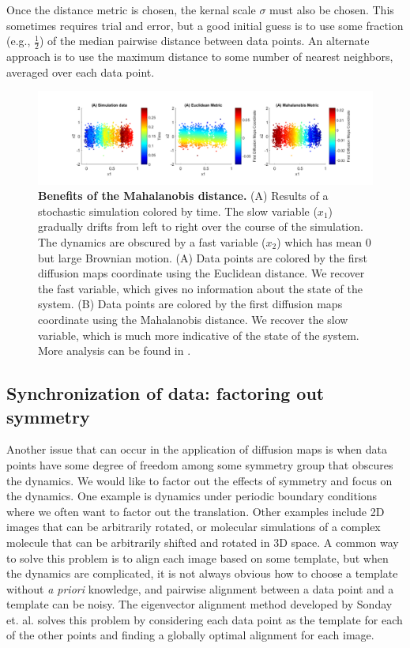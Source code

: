\documentclass[12pt]{article}
\begin{document}
Once the distance metric is chosen, the kernal scale $\sigma$ must also be chosen. This sometimes requires trial and error, but a good initial guess is to use some fraction (e.g., $\frac{1}{2}$) of the median pairwise distance between data points. An alternate approach is to use the maximum distance to some number of nearest neighbors, averaged over each data point.

\begin{figure}[here]
\includegraphics[width=\linewidth, clip=true, trim=115 0 75  0]{figures/my_mahalanobis}
\caption{\textbf{Benefits of the Mahalanobis distance.} (A) Results of a stochastic simulation colored by time. The slow variable ($x_1$) gradually drifts from left to right over the course of the simulation. The dynamics are obscured by a fast variable ($x_2$) which has mean $0$ but large Brownian motion. (A) Data points are colored by the first diffusion maps coordinate using the Euclidean distance. We recover the fast variable, which gives no information about the state of the system. (B) Data points are colored by the first diffusion maps coordinate using the Mahalanobis distance. We recover the slow variable, which is much more indicative of the state of the system. More analysis can be found in \cite{Dsilva2015}.}
\label{fig:mahalanobis}
\end{figure}

\subsection{Synchronization of data: factoring out symmetry}

Another issue that can occur in the application of diffusion maps is when data points have some degree of freedom among some symmetry group that obscures the dynamics. We would like to factor out the effects of symmetry and focus on the dynamics. One example is dynamics under periodic boundary conditions where we often want to factor out the translation. Other examples include 2D images that can be arbitrarily rotated, or molecular simulations of a complex molecule that can be arbitrarily shifted and rotated in 3D space. A common way to solve this problem is to align each image based on some template, but when the dynamics are complicated, it is not always obvious how to choose a template without \textit{a priori} knowledge, and pairwise alignment between a data point and a template can be noisy. The eigenvector alignment method developed by Sonday et. al. \cite{Sonday2013} solves this problem by considering each data point as the template for each of the other points and finding a globally optimal alignment for each image. \vspace{1mm}
\end{document}
